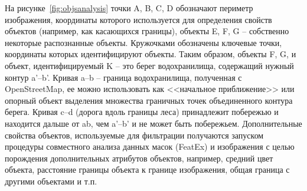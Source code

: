 \documentclass[732,14pt,final]{studrep}
\begin{document}
На рисунке~\ref{fig:objsanalysis} точки A, B, C, D обозначают периметр изображения, координаты которого используется для определения свойств объектов (например, как касающихся границы), объекты E, F, G -- собственно некоторые распознанные объекты. Кружочками обозначены ключевые точки, координаты которых идентифицируют объекты. Таким образом, объекты F, G, и объект, идентифицируемый K -- это берег водохранилища, содержащий нужный контур a’--b’. Кривая a--b -- граница водохранилища, полученная с OpenStreetMap, ее можно использовать как <<начальное приближение>> или опорный объект выделения множества граничных точек объединенного контура берега. Кривая c--d (дорога вдоль границы леса) принадлежит побережью и находится дальше от ab, чем a’--b’ и не может быть побережьем. Дополнительные свойства объектов, используемые для фильтрации получаются запуском процедуры совместного анализа данных масок (FeatEx) и изображения с целью порождения дополнительных атрибутов объектов, например, средний цвет объекта, расстояние границы объекта к границе изображения, общая граница с другими объектами и т.п.
\end{document}
